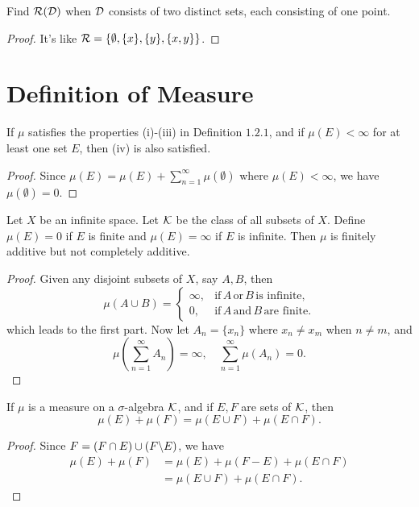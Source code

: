 \begin{pro}%
	Find $\mathcal{R}(\mathcal{D})$ when $\mathcal{D}$ consists of two distinct sets, each consisting of one point.
\end{pro}
\begin{proof}
	It's like $\mathcal{R}=\{\emptyset,\{x\},\{y\},\{x,y\}\}$.
\end{proof}

\section{Definition of Measure}
\begin{pro}%
	If $\mu$ satisfies the properties (i)-(iii) in Definition $1.2.1$, and if $\mu(E)<\infty$ for at least one set $E$, then (iv) is also satisfied.
\end{pro}
\begin{proof}
	Since $\mu(E)=\mu(E)+\sum_{n=1}^\infty \mu(\emptyset)$ where $\mu(E)<\infty$, we have $\mu(\emptyset)=0$.
\end{proof}

\begin{pro}%
	Let $X$ be an infinite space. Let $\mathcal{K}$ be the class of all subsets of $X$. Define $\mu(E)=0$ if $E$ is finite and $\mu(E)=\infty$ if $E$ is infinite. Then $\mu$ is finitely additive but not completely additive.
\end{pro}
\begin{proof}
	Given any disjoint subsets of $X$, say $A,B$, then
	\[\mu(A\cup B)=
	\begin{cases}
	\infty,& \mbox{if}\,A\,\mbox{or}\,B\,\mbox{is infinite},\\
	0,&\mbox{if}\,A\,\mbox{and}\,B\,\mbox{are finite}.
	\end{cases}
	\]
	which leads to the first part. Now let $A_n=\{x_n\}$ where $x_n\neq x_m$ when $n\neq m$, and 
	\[\mu(\sum_{n=1}^\infty A_n)=\infty,\quad\sum_{n=1}^\infty \mu(A_n)=0.\]
\end{proof}

\begin{pro}%
	If $\mu$ is a measure on a $\sigma$-algebra $\mathcal{K}$, and if $E,F$ are sets of $\mathcal{K}$, then
	\[\mu(E)+\mu(F)=\mu(E\cup F)+\mu(E\cap F).\]
\end{pro}
\begin{proof}
	Since $F=(F\cap E)\cup (F\backslash E)$, we have
	\begin{align*}
	\mu(E)+\mu(F)&=\mu(E)+\mu(F-E)+\mu(E\cap F)\\
				 &=\mu(E\cup F)+\mu(E\cap F).
	\end{align*}
\end{proof}

